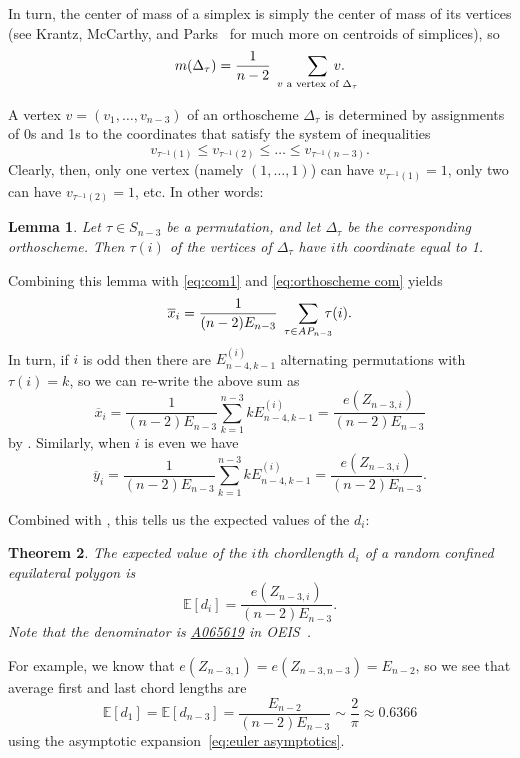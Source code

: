 \documentclass{article}
\newtheorem{theorem}{Theorem}
\newtheorem{lemma}[theorem]{Lemma}
\theoremstyle{definition}
\newcommand{\seqnum}[1]{\href{http://oeis.org/#1}{#1}}
\newcommand{\gent}[3]{E_{#1,#2}^{(#3)}}
\begin{document}
In turn, the center of mass of a simplex is simply the center of mass of its vertices (see Krantz, McCarthy, and Parks~\cite{krantzGeometricCharacterizationsCentroids2006} for much more on centroids of simplices), so
\begin{equation}\label{eq:orthoscheme com}
	m(\Delta_\tau) = \frac{1}{n-2}\; \smashoperator[r]{\sum_{v \text{ a vertex of } \Delta_\tau}}\; v.
\end{equation}

A vertex $v = (v_1, \dots , v_{n-3})$ of an orthoscheme $\Delta_\tau$ is determined by assignments of 0s and 1s to the coordinates that satisfy the system of inequalities
\[
	v_{\tau^{-1}(1)} \leq v_{\tau^{-1}(2)} \leq \dots \leq v_{\tau^{-1}(n-3)}.
\]
Clearly, then, only one vertex (namely $(1,\dots , 1)$) can have $v_{\tau^{-1}(1)} = 1$, only two can have $v_{\tau^{-1}(2)} = 1$, etc. In other words:

\begin{lemma}\label{lem:orthoscheme vertices}
	Let $\tau \in S_{n-3}$ be a permutation, and let $\Delta_\tau$ be the corresponding orthoscheme. Then $\tau(i)$ of the vertices of $\Delta_\tau$ have $i$th coordinate equal to 1.
\end{lemma}

Combining this lemma with \eqref{eq:com1} and \eqref{eq:orthoscheme com} yields
\[
	\overline{x}_i = \frac{1}{(n-2)E_{n-3}} \; \smashoperator[r]{\sum_{\tau \in AP_{n-3}}}\; \tau(i).
\]
In turn, if $i$ is odd then there are $\gent{n-4}{k-1}{i}$ alternating permutations with $\tau(i) = k$, so we can re-write the above sum as
\[
	\overline{x}_i = \frac{1}{(n-2)E_{n-3}} \sum_{k=1}^{n-3} k \gent{n-4}{k-1}{i} = \frac{e(Z_{n-3,i})}{(n-2)E_{n-3}}
\]
by . Similarly, when $i$ is even we have
\[
	\overline{y}_i = \frac{1}{(n-2)E_{n-3}} \sum_{k=1}^{n-3} k \gent{n-4}{k-1}{i} = \frac{e(Z_{n-3,i})}{(n-2)E_{n-3}}.
\]

Combined with , this tells us the expected values of the $d_i$:

\begin{theorem}\label{thm:chord lengths}
	The expected value of the $i$th chordlength $d_i$ of a random confined equilateral polygon is
	\[
		\mathbb{E}[d_i] = \frac{e(Z_{n-3,i})}{(n-2)E_{n-3}}.
	\]
	Note that the denominator is \seqnum{A065619} in OEIS~\cite{oeis}.
\end{theorem}


For example, we know that $e(Z_{n-3,1}) = e(Z_{n-3,n-3}) = E_{n-2}$, so we see that average first and last chord lengths are
\[
	\mathbb{E}[d_1] = \mathbb{E}[d_{n-3}] = \frac{E_{n-2}}{(n-2)E_{n-3}} \sim \frac{2}{\pi} \approx 0.6366
\]
using the asymptotic expansion~\eqref{eq:euler asymptotics}.
\end{document}
